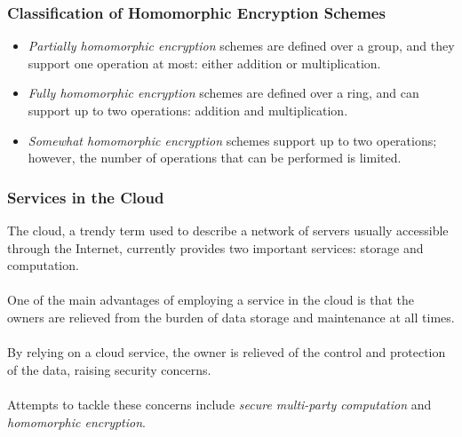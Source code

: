 \documentclass{beamer}
\begin{document}
\begin{frame}
\frametitle{Classification of Homomorphic Encryption Schemes}
\begin{itemize}
  \setlength\itemsep{1.5em}
\item \emph{Partially homomorphic encryption} schemes are defined over a group, and they support one operation at most: either addition or multiplication.  
\item \emph{Fully homomorphic encryption} schemes are defined over a ring, and can support up to two operations: addition and multiplication. 
\item \emph{Somewhat homomorphic encryption} schemes support up to two operations; however, the number of operations that can be performed is limited.
\end{itemize}

\end{frame}
\begin{frame}
\frametitle{Services in the Cloud}
The cloud, a trendy term used to describe a network of servers usually accessible through the Internet, currently provides two important services: storage and computation. \\~\\

One of the main advantages of employing a service in the cloud is that the owners are relieved from the burden of data storage and maintenance at all times. \\~\\

By relying on a cloud service, the owner is relieved of the control and protection of the data, raising security concerns. \\~\\

Attempts to tackle these concerns include \emph{secure multi-party computation} and \emph{homomorphic encryption}. 
\end{frame}
\end{document}
